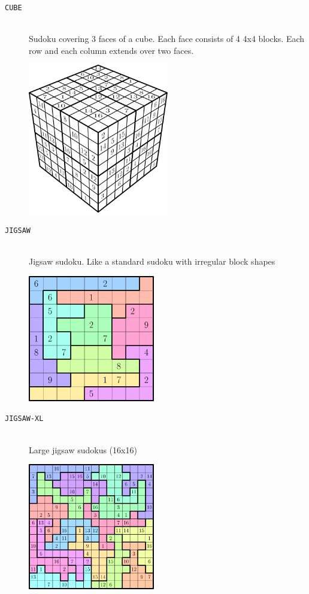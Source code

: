 \documentclass[12pt]{article}
\begin{document}
\begin{description}
\begin{center}
\end{center}
\item [\texttt{CUBE}] \hfill \\ Sudoku covering 3 faces of a cube. Each face consists of 4 4x4 blocks. Each row and each column extends over two faces.	
\begin{center}
	\includegraphics[width=0.5\textwidth]{CUBE}	
\end{center}
\item [\texttt{JIGSAW}] \hfill \\ Jigsaw sudoku. Like a standard sudoku with irregular block shapes	
\begin{center}
	\includegraphics[width=0.45\textwidth]{jigsaw}	
\end{center}
\item [\texttt{JIGSAW-XL}] \hfill \\ Large jigsaw sudokus (16x16)	
\begin{center}
	\includegraphics[width=0.45\textwidth]{jigsawxl}	

\end{center}
\end{description}
\end{document}
